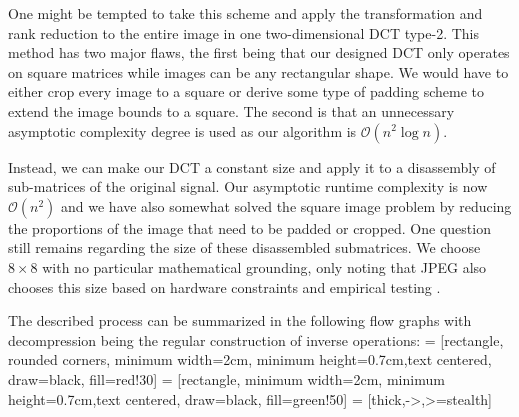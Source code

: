 \documentclass[12pt,technote]{IEEEtran}
\begin{document}
One might be tempted to take this scheme and apply the transformation and rank reduction to the entire image in one two-dimensional DCT type-2. This method has two major flaws, the first being that our designed DCT only operates on square matrices while images can be any rectangular shape. We would have to either crop every image to a square or derive some type of padding scheme to extend the image bounds to a square. The second is that an unnecessary asymptotic complexity degree is used as our algorithm is $\mathcal{O}(n^2\log{n})$.

Instead, we can make our DCT a constant size and apply it to a disassembly of sub-matrices of the original signal. Our asymptotic runtime complexity is now $\mathcal{O}(n^2)$ and we have also somewhat solved the square image problem by reducing the proportions of the image that need to be padded or cropped. One question still remains regarding the size of these disassembled submatrices. We choose $8\times 8$ with no particular mathematical grounding, only noting that JPEG also chooses this size based on hardware constraints and empirical testing \cite{JPEG1992}.

The described process can be summarized in the following flow graphs with decompression being the regular construction of inverse operations:
 = [rectangle, rounded corners, minimum width=2cm, minimum height=0.7cm,text centered, draw=black, fill=red!30]
 = [rectangle, minimum width=2cm, minimum height=0.7cm,text centered, draw=black, fill=green!50]
 = [thick,->,>=stealth]


\begin{center}
\end{center}
\end{document}
